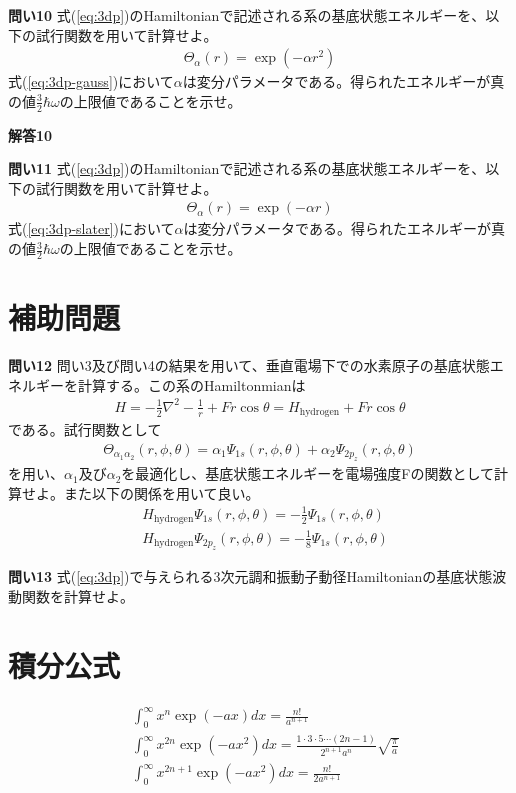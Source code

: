 \documentclass[11pt,pra,aps]{revtex4}
\begin{document}
\noindent
{\bf 問い10} 式(\ref{eq:3dp})のHamiltonianで記述される系の基底状態エネルギーを、以下の試行関数を用いて計算せよ。
\begin{align}
  \Theta_\alpha(r)=\exp(-\alpha r^2) \label{eq:3dp-gauss}
\end{align}
式(\ref{eq:3dp-gauss})において$\alpha$は変分パラメータである。得られたエネルギーが真の値$\frac{3}{2}\hbar\omega$の上限値であることを示せ。

\noindent
{\bf 解答10}
    

\noindent
{\bf 問い11} 式(\ref{eq:3dp})のHamiltonianで記述される系の基底状態エネルギーを、以下の試行関数を用いて計算せよ。
\begin{align}
  \Theta_\alpha(r)=\exp(-\alpha r) \label{eq:3dp-slater}
\end{align}
式(\ref{eq:3dp-slater})において$\alpha$は変分パラメータである。得られたエネルギーが真の値$\frac{3}{2}\hbar\omega$の上限値であることを示せ。

\section{補助問題}

\noindent
{\bf 問い12} 問い3及び問い4の結果を用いて、垂直電場下での水素原子の基底状態エネルギーを計算する。この系のHamiltonmianは
\begin{align}
  H=-\frac{1}{2}\nabla^2-\frac{1}{r}+Fr\cos\theta=H_\text{hydrogen}+Fr\cos\theta
\end{align}
である。試行関数として
\begin{align}
  \Theta_{\alpha_1\alpha_2}(r,\phi,\theta)=\alpha_1\Psi_{1s}(r,\phi,\theta)+\alpha_2\Psi_{2p_z}(r,\phi,\theta)
\end{align}
を用い、$\alpha_1$及び$\alpha_2$を最適化し、基底状態エネルギーを電場強度Fの関数として計算せよ。また以下の関係を用いて良い。
\begin{align}
  &H_\text{hydrogen}\Psi_{1s}(r,\phi,\theta)=-\frac{1}{2}\Psi_{1s}(r,\phi,\theta) \\
  &H_\text{hydrogen}\Psi_{2p_z}(r,\phi,\theta)=-\frac{1}{8}\Psi_{1s}(r,\phi,\theta)
\end{align}

\noindent
{\bf 問い13} 式(\ref{eq:3dp})で与えられる3次元調和振動子動径Hamiltonianの基底状態波動関数を計算せよ。

\section{積分公式}

\begin{align}
  &\int_0^\infty x^n \exp(-ax) dx = \frac{n!}{a^{n+1}} \\
  &\int_0^\infty x^{2n} \exp(-ax^2) dx = \frac{1\cdot3\cdot5\cdots(2n-1)}{2^{n+1}a^n}\sqrt{\frac{\pi}{a}} \\
  &\int_0^\infty x^{2n+1} \exp(-ax^2) dx = \frac{n!}{2 a^{n+1}}
\end{align}
\end{document}
